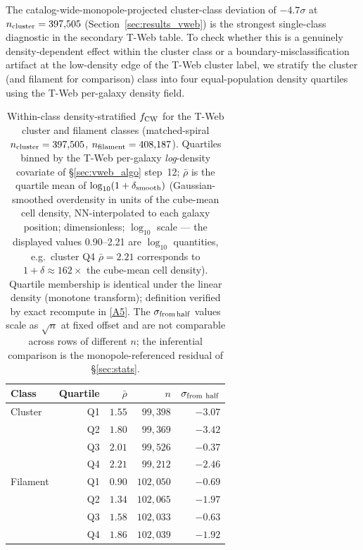 \documentclass[aps,prd,twocolumn,superscriptaddress,showpacs,preprintnumbers,nofootinbib,longbibliography,floatfix]{revtex4-2}
\newcommand{\repoBase}{https://github.com/Hubify-Projects/bigbounce/blob/main}
\begin{document}
The catalog-wide-monopole-projected cluster-class deviation of $-4.7\sigma$ at
$n_{\rm cluster} = 397{,}505$ (Section~\ref{sec:results_vweb}) is the
strongest single-class diagnostic in the secondary T-Web table. To check whether
this is a genuinely density-dependent effect within the cluster class
or a boundary-misclassification artifact at the low-density edge of
the T-Web cluster label, we stratify the cluster (and filament for
comparison) class into four equal-population density quartiles using
the T-Web per-galaxy density field.

\begin{table}[ht]
\caption{Within-class density-stratified $f_{\rm CW}$ for the T-Web
cluster and filament classes (matched-spiral $n_{\rm cluster} =
397{,}505$, $n_{\rm filament} = 408{,}187$). Quartiles binned by the
T-Web per-galaxy \emph{log}-density covariate of \S\ref{sec:vweb_algo}
step~12; $\bar\rho$ is the quartile mean of
$\log_{10}(1 + \delta_{\rm smooth})$ (Gaussian-smoothed overdensity
in units of the cube-mean cell density, NN-interpolated to each
galaxy position; dimensionless; $\log_{10}$ scale --- the displayed
values 0.90--2.21 are $\log_{10}$ quantities, e.g.\ cluster
Q4 $\bar\rho=2.21$ corresponds to $1\!+\!\delta\approx\!162\times$
the cube-mean cell density). Quartile membership is identical under
the linear density (monotone transform); definition verified by exact
recompute in
\href{\repoBase/pipelines/p5\_desi\_chirality/outputs/21\_r23conf\_meta\_closures.json}{[A5]}.
The $\sigma_{\rm from\,half}$ values scale as $\sqrt{n}$ at fixed
offset and are not comparable across rows of different $n$; the
inferential comparison is the monopole-referenced residual of
\S\ref{sec:stats}.}
\label{tab:within_class_density}
\begin{ruledtabular}
\begin{tabular}{lrrrr}
Class & Quartile & $\bar\rho$ & $n$ & $\sigma_{\rm from\ half}$ \\
\hline
Cluster  & Q1 & $1.55$ & $99{,}398$ & $-3.07$ \\
         & Q2 & $1.80$ & $99{,}369$ & $-3.42$ \\
         & Q3 & $2.01$ & $99{,}526$ & $-0.37$ \\
         & Q4 & $2.21$ & $99{,}212$ & $-2.46$ \\
Filament & Q1 & $0.90$ & $102{,}050$ & $-0.69$ \\
         & Q2 & $1.34$ & $102{,}065$ & $-1.97$ \\
         & Q3 & $1.58$ & $102{,}033$ & $-0.63$ \\
         & Q4 & $1.86$ & $102{,}039$ & $-1.92$ \\
\end{tabular}
\end{ruledtabular}
\end{table}
\end{document}
